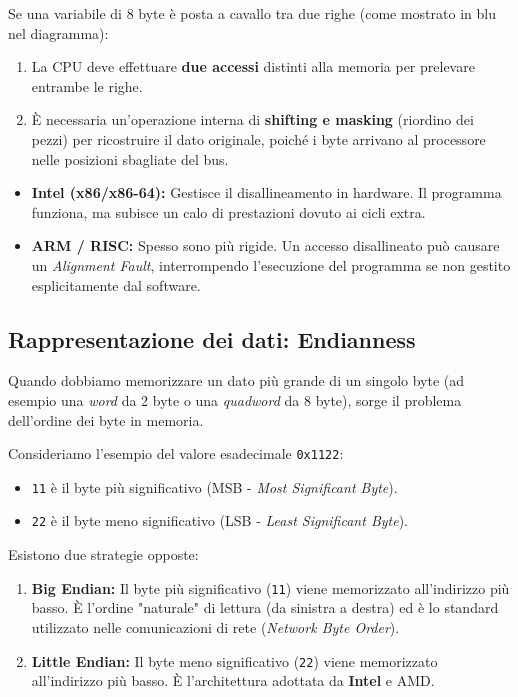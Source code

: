 \documentclass[a4paper,12pt]{article}
\begin{document}
	Se una variabile di 8 byte è posta a cavallo tra due righe (come mostrato in blu nel diagramma):
	\begin{enumerate}
		\item La CPU deve effettuare \textbf{due accessi} distinti alla memoria per prelevare entrambe le righe.
		\item È necessaria un'operazione interna di \textbf{shifting e masking} (riordino dei pezzi) per ricostruire il dato originale, poiché i byte arrivano al processore nelle posizioni sbagliate del bus.
	\end{enumerate}
	
	\begin{tcolorbox}[colback=blue!5!white,colframe=blue!75!black,title=Differenze tra Architetture]
		\begin{itemize}
			\item \textbf{Intel (x86/x86-64):} Gestisce il disallineamento in hardware. Il programma funziona, ma subisce un calo di prestazioni dovuto ai cicli extra.
			\item \textbf{ARM / RISC:} Spesso sono più rigide. Un accesso disallineato può causare un \textit{Alignment Fault}, interrompendo l'esecuzione del programma se non gestito esplicitamente dal software.
		\end{itemize}
	\end{tcolorbox}
	\subsection{Rappresentazione dei dati: Endianness}
	
	Quando dobbiamo memorizzare un dato più grande di un singolo byte (ad esempio una \textit{word} da 2 byte o una \textit{quadword} da 8 byte), sorge il problema dell'ordine dei byte in memoria. 
	
	Consideriamo l'esempio del valore esadecimale \texttt{0x1122}:
	\begin{itemize}
		\item \texttt{11} è il byte più significativo (MSB - \textit{Most Significant Byte}).
		\item \texttt{22} è il byte meno significativo (LSB - \textit{Least Significant Byte}).
	\end{itemize}
	
	Esistono due strategie opposte:
	
	\begin{enumerate}
		\item \textbf{Big Endian:} Il byte più significativo (\texttt{11}) viene memorizzato all'indirizzo più basso. È l'ordine "naturale" di lettura (da sinistra a destra) ed è lo standard utilizzato nelle comunicazioni di rete (\textit{Network Byte Order}).
		\item \textbf{Little Endian:} Il byte meno significativo (\texttt{22}) viene memorizzato all'indirizzo più basso. È l'architettura adottata da \textbf{Intel} e AMD.
	\end{enumerate}
	
\end{document}
